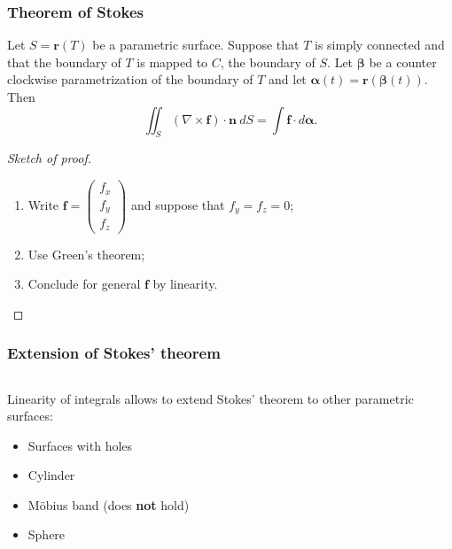 \documentclass[aspectratio=169]{beamer}
\newcommand{\ff}{\mathbf{f}}
\newcommand{\nn}{\mathbf{n}}
\newcommand{\rr}{\mathbf{r}}
\newcommand{\aalpha}{\boldsymbol{\alpha}}
\newcommand{\bbeta}{\boldsymbol{\beta}}
\begin{document}
\begin{frame}
    \frametitle{Theorem of Stokes}


    \begin{theorem}[Stokes]
        Let \(S=\rr(T)\) be a parametric surface.
        Suppose that \(T\) is simply connected and that the boundary of \(T\) is mapped to \(C\), the boundary of \(S\).
        Let \(\bbeta\) be a counter clockwise parametrization of the boundary of \(T\) and let \(\aalpha(t) = \rr(\bbeta(t))\).
        Then
        \[
            \iint_{S} (\nabla \times \ff) \cdot \nn \ dS = \int \ff \cdot d\aalpha.
        \]
    \end{theorem}

    \pause

    \begin{proof}[Sketch of proof]
        \begin{enumerate}
            \item Write \(\ff = \left(\begin{smallmatrix}
                      f_x \\ f_y \\ f_z
                  \end{smallmatrix}\right)\)
                  and suppose that \(f_y = f_z = 0\);
            \item Use Green's theorem;
            \item  Conclude for general \(\ff\) by linearity.
        \end{enumerate}
    \end{proof}
\end{frame}


\begin{frame}
    \frametitle{Extension of Stokes' theorem}

    \begin{columns}
        \begin{column}{.5\textwidth}

            Linearity of integrals allows to extend Stokes' theorem to other parametric surfaces:
            \begin{itemize}
                \item Surfaces with holes
                \item Cylinder
                \item Möbius band (does \textbf{not} hold)
                \item Sphere
            \end{itemize}


        \end{column}
        \begin{column}{.5\textwidth}

        \end{column}
    \end{columns}
\end{frame}
\end{document}

